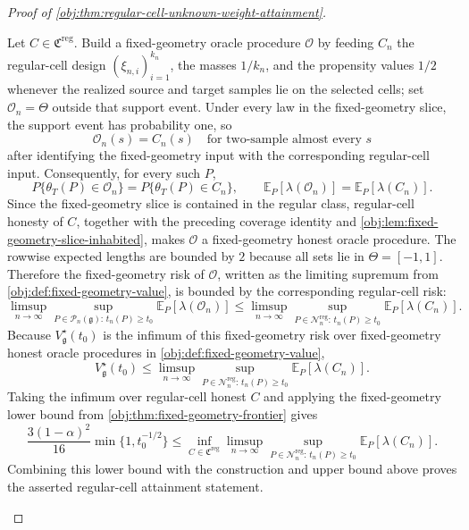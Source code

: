 \begin{proof}[Proof of \cref{obj:thm:regular-cell-unknown-weight-attainment}]
\begin{enumerate}
Let \(C\in\mathfrak C^{\mathrm{reg}}\). Build a fixed-geometry oracle procedure \(\mathcal O\) by feeding \(C_n\) the regular-cell design \((\xi_{n,i})_{i=1}^{k_n}\), the masses \(1/k_n\), and the propensity values \(1/2\) whenever the realized source and target samples lie on the selected cells; set \(\mathcal O_n=\Theta\) outside that support event. Under every law in the fixed-geometry slice, the support event has probability one, so
\[
\mathcal O_n(s)=C_n(s)
\quad\text{for two-sample almost every }s
\]
after identifying the fixed-geometry input with the corresponding regular-cell input. Consequently, for every such \(P\),
\[
P\{\theta_T(P)\in\mathcal O_n\}
=
P\{\theta_T(P)\in C_n\},
\qquad
\mathbb E_P[\lambda(\mathcal O_n)]
=
\mathbb E_P[\lambda(C_n)].
\]
Since the fixed-geometry slice is contained in the regular class, regular-cell honesty of \(C\), together with the preceding coverage identity and \cref{obj:lem:fixed-geometry-slice-inhabited}, makes \(\mathcal O\) a fixed-geometry honest oracle procedure. The rowwise expected lengths are bounded by \(2\) because all sets lie in \(\Theta=[-1,1]\). Therefore the fixed-geometry risk of \(\mathcal O\), written as the limiting supremum from \cref{obj:def:fixed-geometry-value}, is bounded by the corresponding regular-cell risk:
\[
\limsup_{n\to\infty}
\sup_{P\in\mathcal P_n(\mathfrak g):\,t_n(P)\ge t_0}
\mathbb E_P[\lambda(\mathcal O_n)]
\le
\limsup_{n\to\infty}
\sup_{P\in\mathcal N_n^{\mathrm{reg}}:\,t_n(P)\ge t_0}
\mathbb E_P[\lambda(C_n)] .
\]
Because \(V_{\mathfrak g}^\star(t_0)\) is the infimum of this fixed-geometry risk over fixed-geometry honest oracle procedures in \cref{obj:def:fixed-geometry-value},
\[
V_{\mathfrak g}^\star(t_0)
\le
\limsup_{n\to\infty}
\sup_{P\in\mathcal N_n^{\mathrm{reg}}:\,t_n(P)\ge t_0}
\mathbb E_P[\lambda(C_n)].
\]
Taking the infimum over regular-cell honest \(C\) and applying the fixed-geometry lower bound from \cref{obj:thm:fixed-geometry-frontier} gives
\[
\frac{3(1-\alpha)^2}{16}\min\{1,t_0^{-1/2}\}
\le
\inf_{C\in\mathfrak C^{\mathrm{reg}}}
\limsup_{n\to\infty}
\sup_{P\in\mathcal N_n^{\mathrm{reg}}:\,t_n(P)\ge t_0}
\mathbb E_P[\lambda(C_n)] .
\]
Combining this lower bound with the construction and upper bound above proves the asserted regular-cell attainment statement. %
\end{enumerate}
\end{proof}
